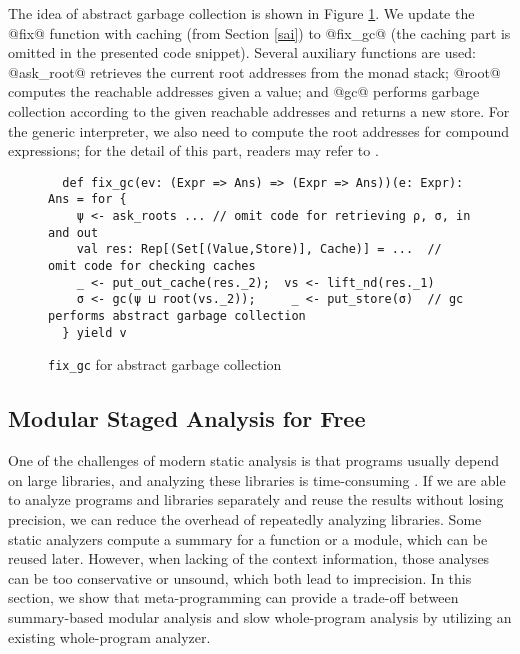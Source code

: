 The idea of abstract garbage collection is shown in Figure \ref{fixgc}. We
update the @fix@ function with caching (from Section \ref{sai}) to @fix_gc@
(the caching part is omitted in the presented code snippet). Several auxiliary
functions are used: @ask_root@ retrieves the current root addresses from the
monad stack; @root@ computes the reachable addresses given a value; and @gc@
performs garbage collection according to the given reachable addresses and
returns a new store. For the generic interpreter, we also need to compute the
root addresses for compound expressions; for the detail of this part, readers
may refer to \cite{DBLP:journals/pacmpl/DaraisLNH17}.

\begin{figure}[h!]
\begin{lstlisting}
  def fix_gc(ev: (Expr => Ans) => (Expr => Ans))(e: Expr): Ans = for {
    ψ <- ask_roots ... // omit code for retrieving ρ, σ, in and out
    val res: Rep[(Set[(Value,Store)], Cache)] = ...  // omit code for checking caches
    _ <- put_out_cache(res._2);  vs <- lift_nd(res._1)
    σ <- gc(ψ ⊔ root(vs._2));     _ <- put_store(σ)  // gc performs abstract garbage collection
  } yield v
\end{lstlisting}
\caption{\texttt{fix\_gc} for abstract garbage collection} \label{fixgc}
\end{figure}



\subsection{Modular Staged Analysis for Free} \label{modular}

One of the challenges of modern static analysis is that programs usually depend
on large libraries, and analyzing these libraries is time-consuming
\cite{toman_et_al:LIPIcs:2017:7121}.
If we are able to analyze programs and libraries separately and reuse the
results without losing precision, we can reduce the overhead of repeatedly
analyzing libraries. Some static analyzers compute a summary for a function or
a module, which can be reused later. However, when lacking of the context
information, those analyses can be too conservative or unsound, which both lead
to imprecision. In this section, we show that meta-programming can provide a
trade-off between summary-based modular analysis and slow whole-program
analysis by utilizing an existing whole-program analyzer.

